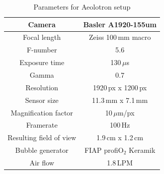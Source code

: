 		\begin{table}
			\centering
		
			\begin{tabular}{|c|c|}
			\hline 
			Camera & Basler A1920-155um \\ 
			\hline 
			Focal length & Zeiss 100\,mm macro\\ 
			\hline 
			F-number & 5.6 \\ 
			\hline 
			Exposure time & 130\,$\mu$s \\ 
			\hline 
			Gamma & 0.7 \\
			\hline
			Resolution &1920\,px x 1200\,px \\
			\hline 
			Sensor size & 11.3\,mm x 7.1\,mm \\
			\hline 
			Magnification factor & 10\,$\mu$m/px \\ 
			\hline 
			Framerate & 100\,Hz \\ 
			\hline 
			Resulting field of view & 1.9\,cm x 1.2\,cm \\
			\hline
			Bubble generator & FIAP profiO$_2$ Keramik\\			
			\hline
			Air flow & 1.8\,LPM  \\ 
			\hline
			\end{tabular} 
			
			\caption{Parameters for Aeolotron setup}
			\label{tab:aeolotron_setup}

		\end{table}
		
